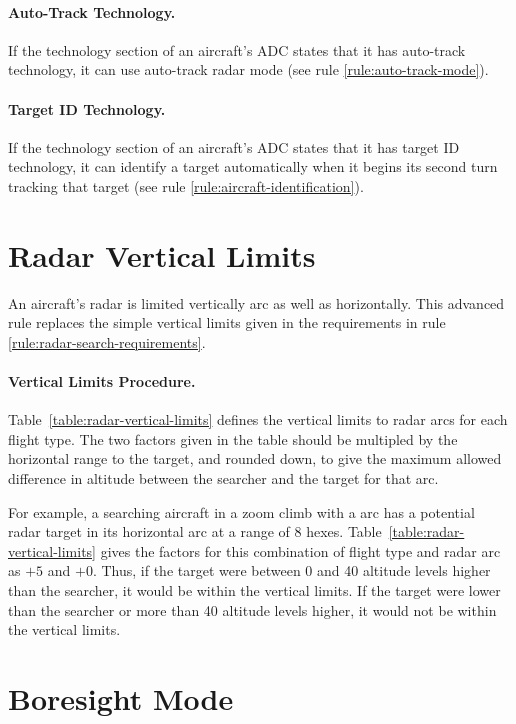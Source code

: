 {\begin{advancedrules}
\paragraph{Auto-Track Technology.}\label{rule:auto-track-technology} If the technology section of an aircraft’s ADC states that it has auto-track technology, it can use auto-track radar mode (see rule \ref{rule:auto-track-mode}).

\paragraph{Target ID Technology.}\label{rule:target-id-technology} If the technology section of an aircraft’s ADC states that it has target ID technology, it can identify a target automatically when it begins its second turn tracking that target (see rule \ref{rule:aircraft-identification}).

\section{Radar Vertical Limits}
\label{rule:radar-vertical-limits}

An aircraft's radar is limited vertically arc as well as horizontally. This advanced rule replaces the simple vertical limits given in the requirements in rule \ref{rule:radar-search-requirements}.

\paragraph{Vertical Limits Procedure.} Table~\ref{table:radar-vertical-limits} defines the vertical limits to radar arcs for each flight type. The two factors given in the table should be multipled by the horizontal range to the target, and rounded down, to give the maximum allowed difference in altitude between the searcher and the target for that arc.

For example, a searching aircraft in a zoom climb with a  arc has a potential radar target in its horizontal arc at a range of 8 hexes. Table~\ref{table:radar-vertical-limits} gives the factors for this combination of flight type and radar arc as $+5$ and $+0$. Thus, if the target were between 0 and 40 altitude levels higher than the searcher, it would be within the vertical limits. If the target were lower than the searcher or more than 40 altitude levels higher, it would not be within the vertical limits.

\section{Boresight Mode} 
\label{rule:boresight-mode}


\end{advancedrules}}

